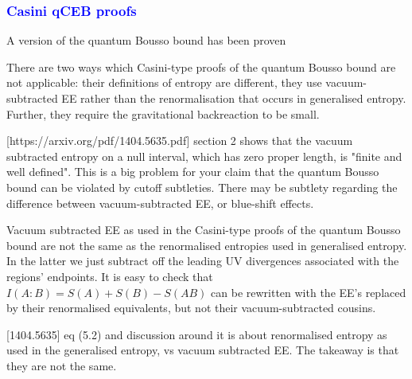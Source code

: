 \documentclass[a4paper,11pt]{article}
\newcommand{\cts}[1]{\ignorespaces}
\newcommand{\st}[1]{\subsubsection*{\textcolor{blue}{#1}}}
\begin{document}



\iffalse

\st{Casini qCEB proofs}

A version of the quantum Bousso bound has been proven

There are two ways which Casini-type proofs of the quantum Bousso bound are not applicable: their definitions of entropy are different, they use vacuum-subtracted EE rather than the renormalisation that occurs in generalised entropy. Further, they require the gravitational backreaction to be small.

[https://arxiv.org/pdf/1404.5635.pdf] section 2 shows that the vacuum subtracted entropy on a null interval, which has zero proper length, is "finite and well defined". This is a big problem for your claim that the quantum Bousso bound can be violated by cutoff subtleties. There may be subtlety regarding the difference between vacuum-subtracted EE, or blue-shift effects. 

Vacuum subtracted EE as used in the Casini-type proofs of the quantum Bousso bound are not the same as the renormalised entropies used in generalised entropy. In the latter we just subtract off the leading UV divergences associated with the regions' endpoints. It is easy to check that $I(A:B) = S(A) + S(B) - S(AB)$ can be rewritten with the EE's replaced by their renormalised equivalents, but not their vacuum-subtracted cousins.

[1404.5635] eq (5.2) and discussion around it is about renormalised entropy as used in the generalised entropy, vs vacuum subtracted EE. The takeaway is that they are not the same.
\end{document}
